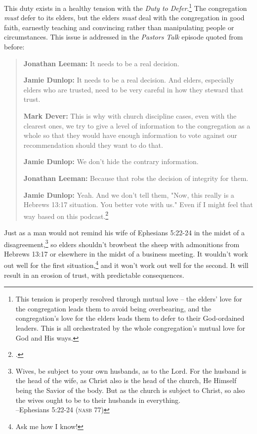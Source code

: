 This duty exists in a healthy tension with the \textit{Duty to Defer}.\footnote{This tension is properly resolved through mutual love -- the elders' love for the congregation leads them to avoid being overbearing, and the congregation's love for the elders leads them to defer to their God-ordained leaders.  This is all orchestrated by the whole congregation's mutual love for God and His ways.}  The congregation \textit{must} defer to its elders, but the elders \textit{must} deal with the congregation in good faith, earnestly teaching and convincing rather than manipulating people or circumstances.  This issue is addressed in the \textit{Pastors Talk} episode quoted from before:
\begin{quote}
\textbf{Jonathan Leeman:}
It needs to be a real decision.

\textbf{Jamie Dunlop:}
It needs to be a real decision. And elders, especially elders who are trusted, need to be very careful in how they steward that trust.

\textbf{Mark Dever:}
This is why with church discipline cases, even with the clearest ones, we try to give a level of information to the congregation as a whole so that they would have enough information to vote against our recommendation should they want to do that.

\textbf{Jamie Dunlop:}
We don't hide the contrary information.

\textbf{Jonathan Leeman:}
Because that robs the decision of integrity for them.

\textbf{Jamie Dunlop:}
Yeah. And we don't tell them, "Now, this really is a Hebrews 13:17 situation. You better vote with us." Even if I might feel that way based on this podcast.\footcite{dever2024vote}
\end{quote}

Just as a man would not remind his wife of Ephesians 5:22-24 in the midst of a disagreement,\footnote{Wives, be subject to your own husbands, as to the Lord. For the husband is the head of the wife, as Christ also is the head of the church, He Himself being the Savior of the body. But as the church is subject to Christ, so also the wives ought to be to their husbands in everything. \\ \hspace*{\fill} --Ephesians 5:22-24 (\textsc{nasb 77})} so elders shouldn't browbeat the sheep with admonitions from Hebrews 13:17 or elsewhere in the midst of a business meeting.  It wouldn't work out well for the first situation,\footnote{Ask me how I know!} and it won't work out well for the second.  It will result in an erosion of trust, with predictable consequences.

